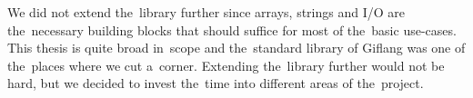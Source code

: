 We did not extend the~library further since arrays, strings and I/O are the~necessary building blocks that should suffice for most of the~basic use-cases.
This thesis is quite broad in~scope and the~standard library of Giflang was one of the~places where we cut a~corner. Extending the~library further would not
be hard, but we decided to invest the~time into different areas of the~project.